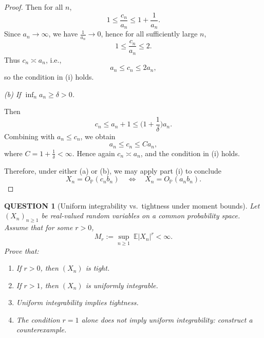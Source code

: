 \documentclass[12pt]{article}
\renewcommand{\(}{\left(}%
\renewcommand{\)}{\right)}%
\renewcommand{\[}{\left[}%
\renewcommand{\]}{\right]}%
\newtheorem{question}{QUESTION}[section]}
\newtheorem{proof}{Proof.}}
\begin{document}
\begin{proof}
Then for all $n$,
\begin{equation*}
1 \le \frac{c_n}{a_n} \le 1 + \frac{1}{a_n}.
\end{equation*}
Since $a_n \to \infty$, we have $\frac{1}{a_n} \to 0$, hence for all sufficiently large $n$,
\begin{equation*}
1 \le \frac{c_n}{a_n} \le 2.
\end{equation*}
Thus $c_n \asymp a_n$, i.e.,
\begin{equation*}
a_n \le c_n \le 2 a_n,
\end{equation*}
so the condition in (i) holds.

\smallskip
\noindent
\emph{(b) If $\inf_n a_n \ge \delta > 0$.}

Then
\begin{equation*}
c_n \le a_n + 1 \le \Big(1 + \frac{1}{\delta}\Big)a_n.
\end{equation*}
Combining with $a_n \le c_n$, we obtain
\begin{equation*}
a_n \le c_n \le C a_n,
\end{equation*}
where $C = 1 + \frac{1}{\delta} < \infty$. Hence again $c_n \asymp a_n$, and the condition in (i) holds.

\smallskip
Therefore, under either (a) or (b), we may apply part (i) to conclude
\begin{equation*}
X_n = O_{\mathbb{P}}(c_n b_n)
\quad \Longleftrightarrow \quad
X_n = O_{\mathbb{P}}(a_n b_n).
\end{equation*}
\end{proof}

\begin{question}[Uniform integrability vs.\ tightness under moment bounds]
Let $(X_n)_{n\ge1}$ be real-valued random variables on a common probability space.
Assume that for some $r>0$,
\begin{equation*}
  M_r:=\sup_{n\ge1}\ \mathbb E|X_n|^r<\infty.
\end{equation*}
Prove that:
\begin{enumerate}
  \item[(a)] If $r>0$, then $(X_n)$ is tight.
  \item[(b)] If $r>1$, then $(X_n)$ is uniformly integrable.
  \item[(c)] Uniform integrability implies tightness.
  \item[(d)] The condition $r=1$ alone does \emph{not} imply uniform integrability: construct a counterexample.
\end{enumerate}
\end{question}
\end{document}
